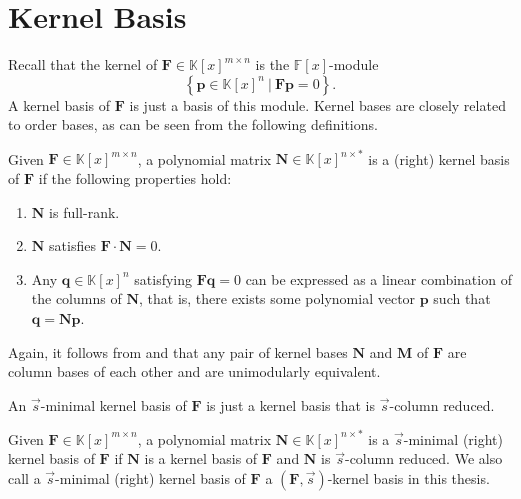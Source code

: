 \section{Kernel Basis}

Recall that the kernel of $\mathbf{F}\in\mathbb{K}\left[x\right]^{m\times n}$
is the $\mathbb{F}\left[x\right]$-module 
\[
\left\{ \mathbf{p}\in\mathbb{K}\left[x\right]^{n}~|~\mathbf{F}\mathbf{p}=0\right\} .
\]
 A kernel basis of $\mathbf{F}$ is just a basis of this module. Kernel
bases are closely related to order bases, as can be seen from the
following definitions. 
\begin{defn}
\label{def:kernelBasis}Given $\mathbf{F}\in\mathbb{K}\left[x\right]^{m\times n}$,
a polynomial matrix $\mathbf{N}\in\mathbb{K}\left[x\right]^{n\times*}$
is a (right) kernel basis of $\mathbf{F}$ if the following properties
hold: 
\begin{enumerate}
\item $\mathbf{N}$ is full-rank. 
\item $\mathbf{N}$ satisfies $\mathbf{F}\cdot\mathbf{N}=0$. 
\item Any $\mathbf{q}\in\mathbb{K}\left[x\right]^{n}$ satisfying $\mathbf{F}\mathbf{q}=0$
can be expressed as a linear combination of the columns of $\mathbf{N}$,
that is, there exists some polynomial vector $\mathbf{p}$ such that
$\mathbf{q}=\mathbf{N}\mathbf{p}$. 
\end{enumerate}
\end{defn}
Again, it follows from  and 
that any pair of kernel bases $\mathbf{N}$ and $\mathbf{M}$ of $\mathbf{F}$
are column bases of each other and are unimodularly equivalent.

An $\vec{s}$-minimal kernel basis of $\mathbf{F}$ is just a kernel
basis that is $\vec{s}$-column reduced.
\begin{defn}
Given $\mathbf{F}\in\mathbb{K}\left[x\right]^{m\times n}$, a polynomial
matrix $\mathbf{N}\in\mathbb{K}\left[x\right]^{n\times*}$ is a $\vec{s}$-minimal
(right) kernel basis of $\mathbf{F}$ if\textbf{ $\mathbf{N}$} is
a kernel basis of $\mathbf{F}$ and $\mathbf{N}$ is $\vec{s}$-column
reduced. We also call a $\vec{s}$-minimal (right) kernel basis of
$\mathbf{F}$ a $\left(\mathbf{F},\vec{s}\right)$-kernel basis in
this thesis.
\end{defn}




\begin{comment}
Note that the module $\left\langle \left(\mathbf{F},\vec{\sigma}\right)\right\rangle $
does not depend on the shift $\vec{s}$. 
\end{comment}


